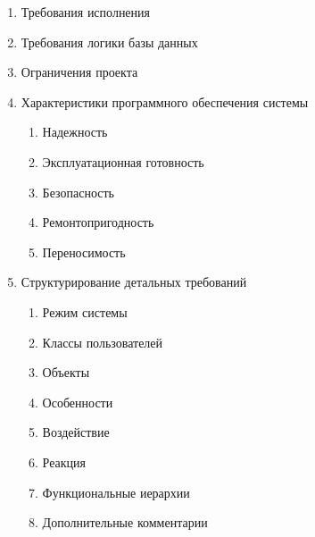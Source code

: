 \documentclass[12pt]{article} %
\begin{document}
\begin{enumerate}
\begin{enumerate}
  		\item Требования исполнения
  		\item Требования логики базы данных
  		\item Ограничения проекта
  		\item Характеристики программного обеспечения системы
  			\begin{enumerate}
  				\item Надежность
  				\item Эксплуатационная готовность
  				\item Безопасность
  				\item Ремонтопригодность
  				\item Переносимость
  			\end{enumerate}
  		\item Структурирование детальных требований
  			\begin{enumerate}
  				\item Режим системы
  				\item Классы пользователей
  				\item Объекты
  				\item Особенности
  				\item Воздействие
  				\item Реакция
  				\item Функциональные иерархии
  				\item Дополнительные комментарии
  			\end{enumerate}
  	\end{enumerate}
\end{enumerate}
 
\end{document}
